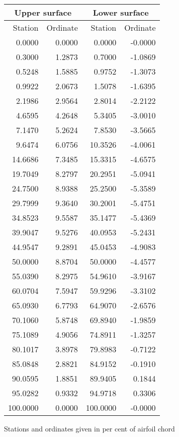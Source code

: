 \documentclass[11pt]{book}
\begin{document}
 \hspace{4mm}
 \begin{tabular}{|r|r|r|r|} \hline 
 \multicolumn{2}{|c|}{Upper surface} & \multicolumn{2}{|c|}{Lower surface} \\
 \hline
 Station & Ordinate & Station & Ordinate \\
 \hline
0.0000 & 0.0000 & 0.0000 & -0.0000 \\
0.3000 & 1.2873 & 0.7000 & -1.0869 \\
0.5248 & 1.5885 & 0.9752 & -1.3073 \\
0.9922 & 2.0673 & 1.5078 & -1.6395 \\
2.1986 & 2.9564 & 2.8014 & -2.2122 \\
4.6595 & 4.2648 & 5.3405 & -3.0010 \\
7.1470 & 5.2624 & 7.8530 & -3.5665 \\
9.6474 & 6.0756 & 10.3526 & -4.0061 \\
14.6686 & 7.3485 & 15.3315 & -4.6575 \\
19.7049 & 8.2797 & 20.2951 & -5.0941 \\
24.7500 & 8.9388 & 25.2500 & -5.3589 \\
29.7999 & 9.3640 & 30.2001 & -5.4751 \\
34.8523 & 9.5587 & 35.1477 & -5.4369 \\
39.9047 & 9.5276 & 40.0953 & -5.2431 \\
44.9547 & 9.2891 & 45.0453 & -4.9083 \\
50.0000 & 8.8704 & 50.0000 & -4.4577 \\
55.0390 & 8.2975 & 54.9610 & -3.9167 \\
60.0704 & 7.5947 & 59.9296 & -3.3102 \\
65.0930 & 6.7793 & 64.9070 & -2.6576 \\
70.1060 & 5.8748 & 69.8940 & -1.9859 \\
75.1089 & 4.9056 & 74.8911 & -1.3257 \\
80.1017 & 3.8978 & 79.8983 & -0.7122 \\
85.0848 & 2.8821 & 84.9152 & -0.1910 \\
90.0595 & 1.8851 & 89.9405 & 0.1844 \\
95.0282 & 0.9332 & 94.9718 & 0.3306 \\
100.0000 & 0.0000 & 100.0000 & -0.0000 \\
 \hline 
 \end{tabular}
 \vspace{8mm}

Stations and ordinates given in per cent of airfoil chord
\end{document}

